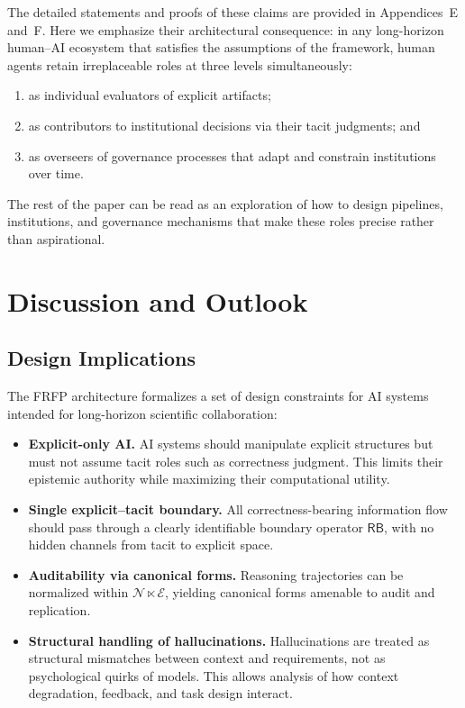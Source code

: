 \documentclass[11pt]{article}
\theoremstyle{definition}
\newcommand{\Ecat}{\mathcal{E}} %
\newcommand{\Ncat}{\mathcal{N}} %
\newcommand{\RB}{\mathsf{RB}}   %
\begin{document}
The detailed statements and proofs of these claims are provided in Appendices~E and~F. Here we emphasize their architectural consequence: in any long-horizon human--AI ecosystem that satisfies the assumptions of the framework, human agents retain irreplaceable roles at three levels simultaneously:
\begin{enumerate}
  \item as individual evaluators of explicit artifacts;
  \item as contributors to institutional decisions via their tacit judgments; and
  \item as overseers of governance processes that adapt and constrain institutions over time.
\end{enumerate}
The rest of the paper can be read as an exploration of how to design pipelines, institutions, and governance mechanisms that make these roles precise rather than aspirational.

\section{Discussion and Outlook}
\label{sec:discussion}

\subsection{Design Implications}

The FRFP architecture formalizes a set of design constraints for AI
systems intended for long-horizon scientific collaboration:

\begin{itemize}[leftmargin=2em]
  \item \textbf{Explicit-only AI.} AI systems should manipulate explicit
        structures but must not assume tacit roles such as correctness
        judgment. This limits their epistemic authority while maximizing
        their computational utility.
  \item \textbf{Single explicit--tacit boundary.} All correctness-bearing
        information flow should pass through a clearly identifiable
        boundary operator \(\RB\), with no hidden channels from tacit
        to explicit space.
  \item \textbf{Auditability via canonical forms.} Reasoning trajectories
        can be normalized within \(\Ncat \ltimes \Ecat\), yielding
        canonical forms amenable to audit and replication.
  \item \textbf{Structural handling of hallucinations.} Hallucinations
        are treated as structural mismatches between context and
        requirements, not as psychological quirks of models. This allows
        analysis of how context degradation, feedback, and task design
        interact.
\end{itemize}
\end{document}
